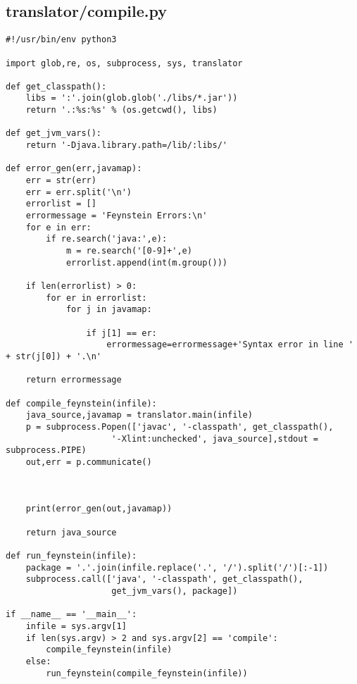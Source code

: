 \subsection*{translator/compile.py}
\begin{lstlisting}
#!/usr/bin/env python3

import glob,re, os, subprocess, sys, translator

def get_classpath():
    libs = ':'.join(glob.glob('./libs/*.jar'))
    return '.:%s:%s' % (os.getcwd(), libs)

def get_jvm_vars():
    return '-Djava.library.path=/lib/:libs/'

def error_gen(err,javamap):
    err = str(err)
    err = err.split('\n')
    errorlist = []
    errormessage = 'Feynstein Errors:\n'
    for e in err:
        if re.search('java:',e):
            m = re.search('[0-9]+',e)
            errorlist.append(int(m.group()))
    
    if len(errorlist) > 0:
        for er in errorlist:
            for j in javamap:
                
                if j[1] == er:
                    errormessage=errormessage+'Syntax error in line ' + str(j[0]) + '.\n'

    return errormessage

def compile_feynstein(infile):
    java_source,javamap = translator.main(infile)
    p = subprocess.Popen(['javac', '-classpath', get_classpath(), 
                     '-Xlint:unchecked', java_source],stdout = subprocess.PIPE)
    out,err = p.communicate()
    
    
    
    print(error_gen(out,javamap))

    return java_source

def run_feynstein(infile):
    package = '.'.join(infile.replace('.', '/').split('/')[:-1])
    subprocess.call(['java', '-classpath', get_classpath(), 
                     get_jvm_vars(), package])

if __name__ == '__main__':
    infile = sys.argv[1]
    if len(sys.argv) > 2 and sys.argv[2] == 'compile':
        compile_feynstein(infile)
    else:
        run_feynstein(compile_feynstein(infile))
\end{lstlisting}

